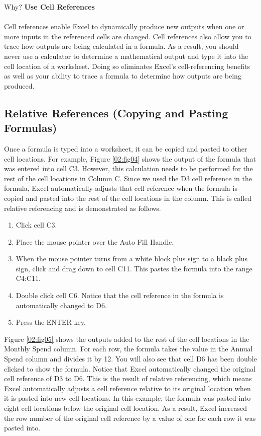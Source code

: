 \begin{center}
	\begin{infobox}{Why?}
		\textbf{Use Cell References}
		\\
		\\
		Cell references enable Excel to dynamically produce new outputs when one or more inputs in the referenced cells are changed. Cell references also allow you to trace how outputs are being calculated in a formula. As a result, you should never use a calculator to determine a mathematical output and type it into the cell location of a worksheet. Doing so eliminates Excel's cell-referencing benefits as well as your ability to trace a formula to determine how outputs are being produced.
	\end{infobox}
\end{center}

\subsection{Relative References (Copying and Pasting Formulas)}

Once a formula is typed into a worksheet, it can be copied and pasted to other cell locations. For example, Figure \ref{02:fig04} shows the output of the formula that was entered into cell \textsf{C3}. However, this calculation needs to be performed for the rest of the cell locations in Column \textsf{C}. Since we used the \textsf{D3} cell reference in the formula, Excel automatically adjusts that cell reference when the formula is copied and pasted into the rest of the cell locations in the column. This is called relative referencing and is demonstrated as follows.

\begin{enumerate}
	\item Click cell \textsf{C3}.
	\item Place the mouse pointer over the Auto Fill Handle.
	\item When the mouse pointer turns from a white block plus sign to a black plus sign, click and drag down to cell \textsf{C11}. This pastes the formula into the range \textsf{C4:C11}.
	\item Double click cell \textsf{C6}. Notice that the cell reference in the formula is automatically changed to \textsf{D6}.
	\item Press the ENTER key.
\end{enumerate}

Figure \ref{02:fig05} shows the outputs added to the rest of the cell locations in the Monthly Spend column. For each row, the formula takes the value in the Annual Spend column and divides it by 12. You will also see that cell \textsf{D6} has been double clicked to show the formula. Notice that Excel automatically changed the original cell reference of \textsf{D3} to \textsf{D6}. This is the result of relative referencing, which means Excel automatically adjusts a cell reference relative to its original location when it is pasted into new cell locations. In this example, the formula was pasted into eight cell locations below the original cell location. As a result, Excel increased the row number of the original cell reference by a value of one for each row it was pasted into.

